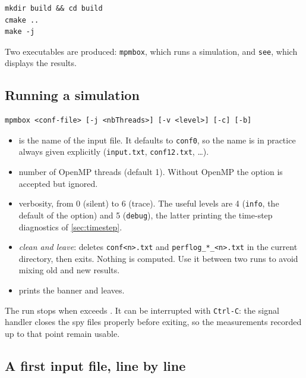 \documentclass[a4paper,onecolumn,11pt]{doofus}
\begin{document}
\begin{lstlisting}[style=mystyle,numbers=none]
mkdir build && cd build
cmake ..
make -j
\end{lstlisting}

Two executables are produced: \texttt{mpmbox}, which runs a simulation, and \texttt{see},
which displays the results.

\subsection{Running a simulation}
\label{sec:running}

\begin{lstlisting}[style=mystyle,numbers=none]
mpmbox <conf-file> [-j <nbThreads>] [-v <level>] [-c] [-b]
\end{lstlisting}

\begin{itemize}
\item {} is the name of the input file. It defaults to \texttt{conf0}, so the
      name is in practice always given explicitly (\texttt{input.txt}, \texttt{conf12.txt}, \dots).
\item {} number of OpenMP threads (default 1). Without OpenMP the
      option is accepted but ignored.
\item {} verbosity, from 0 (silent) to 6 (trace). The useful levels are
      4 (\texttt{info}, the default of the option) and 5 (\texttt{debug}), the latter printing
      the time-step diagnostics of \cref{sec:timestep}.
\item {} \emph{clean and leave}: deletes \texttt{conf<n>.txt} and
      \texttt{perflog\_*\_<n>.txt} in the current directory, then exits. Nothing is computed.
      Use it between two runs to avoid mixing old and new results.
\item {} prints the banner and leaves.
\end{itemize}

The run stops when  exceeds . It can be interrupted with
\texttt{Ctrl-C}: the signal handler closes the spy files properly before exiting, so the
measurements recorded up to that point remain usable.

\subsection{A first input file, line by line}
\label{sec:firstinput}
\end{document}
